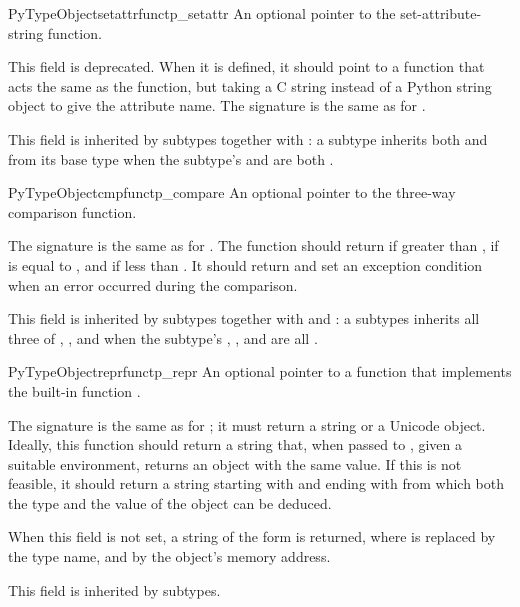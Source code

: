 \begin{cmemberdesc}{PyTypeObject}{setattrfunc}{tp_setattr}
  An optional pointer to the set-attribute-string function.

  This field is deprecated.  When it is defined, it should point to a
  function that acts the same as the  function,
  but taking a C string instead of a Python string object to give the
  attribute name.  The signature is the same as for
  .

  This field is inherited by subtypes together with
  : a subtype inherits both 
  and  from its base type when the subtype's
   and  are both \NULL.
\end{cmemberdesc}

\begin{cmemberdesc}{PyTypeObject}{cmpfunc}{tp_compare}
  An optional pointer to the three-way comparison function.

  The signature is the same as for .
  The function should return  if  greater than
  ,  if  is equal to , and
   if  less than .  It should return
   and set an exception condition when an error occurred
  during the comparison.

  This field is inherited by subtypes together with
   and : a subtypes inherits
  all three of , , and
   when the subtype's ,
  , and  are all \NULL.
\end{cmemberdesc}

\begin{cmemberdesc}{PyTypeObject}{reprfunc}{tp_repr}
  An optional pointer to a function that implements the built-in
  function .

  The signature is the same as for ; it
  must return a string or a Unicode object.  Ideally, this function
  should return a string that, when passed to , given
  a suitable environment, returns an object with the same value.  If
  this is not feasible, it should return a string starting with
  \character{\textless} and ending with \character{\textgreater} from
  which both the type and the value of the object can be deduced.

  When this field is not set, a string of the form  is returned, where  is replaced by the type name,
  and  by the object's memory address.

  This field is inherited by subtypes.
\end{cmemberdesc}


